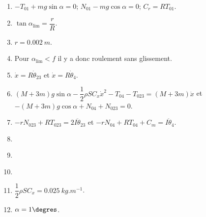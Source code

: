 \documentclass[10pt,fleqn]{article} %
\begin{document}
\begin{multicols}{2}
\ifprof
\else
\begin{enumerate}
\item $-T_{01} +mg\sin\alpha = 0$; $N_{01} -mg\cos\alpha = 0$; $C_r=RT_{01}$.
\item $\tan \alpha_{\text{lim}} = \dfrac{r}{R}$.
\item $r=\SI{0,002}{m}$.
\item Pour $\alpha_{\text{lim}}<f$ il y a donc roulement sans glissement.
\item $\dot{x}=R \dot{\theta}_{23}$ et $\dot{x}=R \dot{\theta}_{4} $.
\item $\left(M+3m\right)g\sin \alpha -\dfrac{1}{2}\rho S C_x \dot{x}^2-T_{04}-T_{023}=\left(M+3m\right)\ddot{x}$ et $-\left(M+3m\right)g \cos \alpha +N_{04}+N_{023}=0$.
\item $-rN_{023}+RT_{023}=2I\ddot{\theta}_{23}$ et $-rN_{04}+RT_{04}+C_m=I\ddot{\theta}_{4}$.
\item $\,$
\item $\,$
\item $\,$
\item $\dfrac{1}{2}\rho S C_x = \SI{0,025}{kg.m^{-1}}$.
\item $\alpha=1\degres$.
\end{enumerate}
\fi

\ifprof
\else
\end{multicols}
\fi
\end{document}
